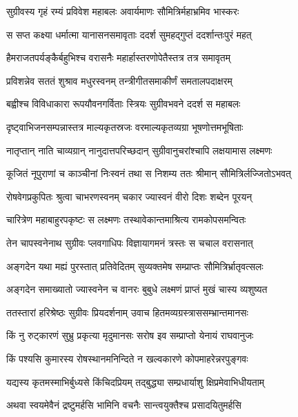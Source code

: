 \twolineshloka
{सुग्रीवस्य गृहं रम्यं प्रविवेश महाबलः}
{अवार्यमाणः सौमित्रिर्महाभ्रमिव भास्करः} %

\twolineshloka
{स सप्त कक्ष्या धर्मात्मा यानासनसमावृताः}
{ददर्श सुमहद्गुप्तं ददर्शान्तःपुरं महत्} %

\twolineshloka
{हैमराजतपर्यङ्कैर्बहुभिश्च वरासनैः}
{महार्हास्तरणोपेतैस्तत्र तत्र समावृतम्} %

\twolineshloka
{प्रविशन्नेव सततं शुश्राव मधुरस्वनम्}
{तन्त्रीगीतसमाकीर्णं समतालपदाक्षरम्} %

\twolineshloka
{बह्वीश्च विविधाकारा रूपयौवनगर्विताः}
{स्त्रियः सुग्रीवभवने ददर्श स महाबलः} %

\twolineshloka
{दृष्ट्वाभिजनसम्पन्नास्तत्र माल्यकृतस्रजः}
{वरमाल्यकृतव्यग्रा भूषणोत्तमभूषिताः} %

\twolineshloka
{नातृप्तान् नाति चाव्यग्रान् नानुदात्तपरिच्छदान्}
{सुग्रीवानुचरांश्चापि लक्षयामास लक्ष्मणः} %

\twolineshloka
{कूजितं नूपुराणां च काञ्चीनां निःस्वनं तथा}
{स निशम्य ततः श्रीमान् सौमित्रिर्लज्जितोऽभवत्} %

\twolineshloka
{रोषवेगप्रकुपितः श्रुत्वा चाभरणस्वनम्}
{चकार ज्यास्वनं वीरो दिशः शब्देन पूरयन्} %

\twolineshloka
{चारित्रेण महाबाहुरपकृष्टः स लक्ष्मणः}
{तस्थावेकान्तमाश्रित्य रामकोपसमन्वितः} %

\twolineshloka
{तेन चापस्वनेनाथ सुग्रीवः प्लवगाधिपः}
{विज्ञायागमनं त्रस्तः स चचाल वरासनात्} %

\twolineshloka
{अङ्गदेन यथा मह्यं पुरस्तात् प्रतिवेदितम्}
{सुव्यक्तमेष सम्प्राप्तः सौमित्रिर्भ्रातृवत्सलः} %

\twolineshloka
{अङ्गदेन समाख्यातो ज्यास्वनेन च वानरः}
{बुबुधे लक्ष्मणं प्राप्तं मुखं चास्य व्यशुष्यत} %

\twolineshloka
{ततस्तारां हरिश्रेष्ठः सुग्रीवः प्रियदर्शनाम्}
{उवाच हितमव्यग्रस्त्राससम्भ्रान्तमानसः} %

\twolineshloka
{किं नु रुट्कारणं सुभ्रु प्रकृत्या मृदुमानसः}
{सरोष इव सम्प्राप्तो येनायं राघवानुजः} %

\twolineshloka
{किं पश्यसि कुमारस्य रोषस्थानमनिन्दिते}
{न खल्वकारणे कोपमाहरेन्नरपुङ्गवः} %

\twolineshloka
{यद्यस्य कृतमस्माभिर्बुध्यसे किंचिदप्रियम्}
{तद्बुद्ध्या सम्प्रधार्याशु क्षिप्रमेवाभिधीयताम्} %

\twolineshloka
{अथवा स्वयमेवैनं द्रष्टुमर्हसि भामिनि}
{वचनैः सान्त्वयुक्तैश्च प्रसादयितुमर्हसि} %

